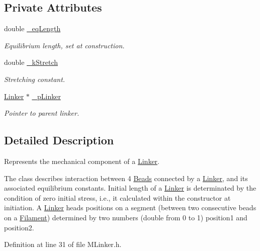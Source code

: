 \subsection*{Private Attributes}
\begin{DoxyCompactItemize}
\item 
double \hyperlink{classMLinker_a261139854320352d80c7b236bb924602}{\+\_\+eq\+Length}
\begin{DoxyCompactList}\small\item\em Equilibrium length, set at construction. \end{DoxyCompactList}\item 
double \hyperlink{classMLinker_ac42b3d84c2cd277440c052f2f80ea68c}{\+\_\+k\+Stretch}
\begin{DoxyCompactList}\small\item\em Stretching constant. \end{DoxyCompactList}\item 
\hyperlink{classLinker}{Linker} $\ast$ \hyperlink{classMLinker_abf4cccf6a06de78c9856c13c903c8edd}{\+\_\+p\+Linker}
\begin{DoxyCompactList}\small\item\em Pointer to parent linker. \end{DoxyCompactList}\end{DoxyCompactItemize}


\subsection{Detailed Description}
Represents the mechanical component of a \hyperlink{classLinker}{Linker}. 

The class describes interaction between 4 \hyperlink{classBead}{Beads} connected by a \hyperlink{classLinker}{Linker}, and its associated equilibrium constants. Initial length of a \hyperlink{classLinker}{Linker} is determinated by the condition of zero initial stress, i.\+e., it calculated within the constructor at initiation. A \hyperlink{classLinker}{Linker} heads positions on a segment (between two consecutive beads on a \hyperlink{classFilament}{Filament}) determined by two numbers (double from 0 to 1) position1 and position2. 

Definition at line 31 of file M\+Linker.\+h.



